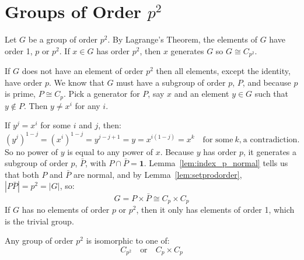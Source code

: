 \section{Groups of Order \(p^2\)}
Let \(G\) be a group of order \(p^2\).
By Lagrange's Theorem, the elements of \(G\) have order 1, \(p\) or \(p^2\).
If \(x \in G\) has order \(p^2\), then \(x\) generates \(G\) so \(G \cong C_{p^2}\).

If \(G\) does not have an element of order \(p^2\) then all elements, except the identity, have order \(p\).
We know that \(G\) must have a subgroup of order \(p\), \(P\), and because \(p\) is prime, \(P \cong C_p\).
Pick a generator for \(P\), say \(x\) and an element \(y \in G\) such that \(y \notin P\).
Then \(y \neq x^i\) for any \(i\).

If \(y^j = x^i\) for some \(i\) and \(j\), then:
\[{(y^j)}^{1-j} = {(x^i)}^{1-j} = y^{j-j+1} = y = x^{i(1-j)} = x^k \quad \text{for some} \ k\text{,} \ \text{a
contradiction.}\]
So no power of \(y\) is equal to any power of \(x\).
Because \(y\) has order \(p\), it generates a subgroup of order \(p\), \(\bar{P}\), with \(P \cap \bar{P} = \bm{1}\).
Lemma~\ref{lem:index_p_normal} tells us that both \(P\) and \(\bar{P}\) are normal, and by Lemma~\ref{lem:setprodorder},
\(|P\bar{P}| = p^2 = |G|\), so:
\[G = P \times \bar{P} \cong C_p \times C_p\]
If \(G\) has no elements of order \(p\) or \(p^2\), then it only has elements of order 1, which is the trivial group.

\begin{mdframed}[align=center,nobreak=true]
    \begin{center}
        Any group of order \(p^2\) is isomorphic to one of:
        \[C_{p^2} \quad \text{or} \quad C_p \times C_p\]
    \end{center}
\end{mdframed}
